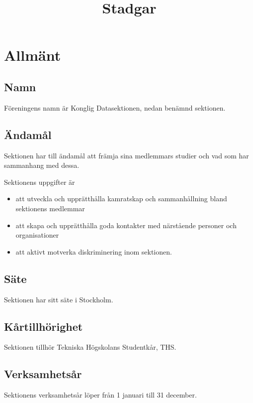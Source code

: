 \documentclass{dgovdoc}
\title{Stadgar}
\begin{document}
\maketitle

\section{Allmänt}

\subsection{Namn}
\label{sec:namn}

Föreningens namn är Konglig Datasektionen, nedan benämnd sektionen.

\subsection{Ändamål}

Sektionen har till ändamål att främja sina medlemmars studier och vad som har
sammanhang med dessa.

Sektionens uppgifter är

\begin{itemize}
  \item att utveckla och upprätthålla kamratskap och sammanhållning bland
    sektionens medlemmar
  \item att skapa och upprätthålla goda kontakter med närstående personer och
    organisationer
  \item att aktivt motverka diskriminering inom sektionen.
\end{itemize}

\subsection{Säte}

Sektionen har sitt säte i Stockholm.

\subsection{Kårtillhörighet}

Sektionen tillhör Tekniska Högskolans Studentkår, THS.

\subsection{Verksamhetsår}

Sektionens verksamhetsår löper från 1 januari till 31 december.
\end{document}
